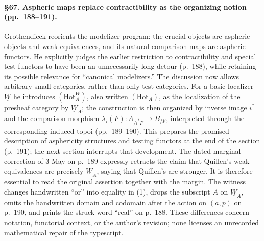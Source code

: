 \paragraph{\S67. Aspheric maps replace contractibility as the organizing notion (pp.\ 188--191).}
Grothendieck reorients the modelizer program: the crucial objects are aspheric objects and weak equivalences, and its natural comparison maps are aspheric functors. He explicitly judges the earlier restriction to contractibility and special test functors to have been an unnecessarily long detour (p.\ 188), while retaining its possible relevance for ``canonical modelizers.'' The discussion now allows arbitrary small categories, rather than only test categories. For a basic localizer $\underline W$ he introduces $(\mathrm{Hot}^{W}_{A})$, also written $(\mathrm{Hot}_{A})$, as the localization of the presheaf category by $\underline W_A$; the construction is then organized by inverse image $i^*$ and the comparison morphism $\lambda_i(F):A_{/i^*F}\longrightarrow B_{/F}$, interpreted through the corresponding induced topoi (pp.\ 189--190). This prepares the promised description of asphericity structures and testing functors at the end of the section (p.\ 191); the next section interrupts that development. The dated marginal correction of 3 May on p.\ 189 expressly retracts the claim that Quillen's weak equivalences are precisely $\underline W_A$, saying that Quillen's are stronger. It is therefore essential to read the original assertion together with the margin. The witness changes handwritten ``or'' into equality in (1), drops the subscript $A$ on $\underline W_A$, omits the handwritten domain and codomain after the action on $(a,p)$ on p.\ 190, and prints the struck word ``real'' on p.\ 188. These differences concern notation, functorial context, or the author's revision; none licenses an unrecorded mathematical repair of the typescript.

